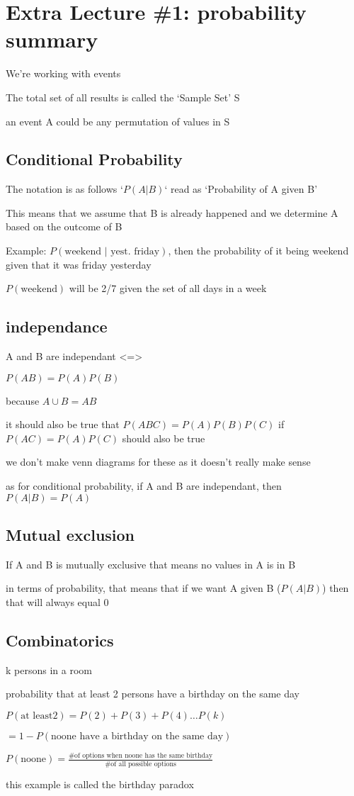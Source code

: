 \section*{Extra Lecture \#1: probability summary}
We're working with events

The total set of all results is called the `Sample Set' S

an event A could be any permutation of values in S

\subsection*{Conditional Probability}
The notation is as follows `$P(A|B)$` read as `Probability of A given B'

This means that we assume that B is already happened and we determine A based on the outcome of B

Example: $P(\text{weekend | yest.\ friday})$, then the probability of it being weekend given that it was friday yesterday

$P(\text{weekend})$ will be 2/7 given the set of all days in a week

\subsection*{independance}
A and B are independant <=>

$P(AB) = P(A)P(B)$

because $A \cup B = AB$

it should also be true that $P(ABC) = P(A)P(B)P(C)$ if $P(AC) = P(A)P(C)$ should also be true

we don't make venn diagrams for these as it doesn't really make sense

as for conditional probability, if A and B are independant, then $P(A|B) = P(A)$

\subsection*{Mutual exclusion}
If A and B is mutually exclusive that means no values in A is in B

in terms of probability, that means that if we want A given B ($P(A|B)$) then that will always equal 0

\subsection*{Combinatorics}
k persons in a room

probability that at least 2 persons have a birthday on the same day

$P(\text{at least}2) = P(2)+P(3)+P(4) \dots P(k)$

$= 1 - P(\text{noone have a birthday on the same day})$

$P(\text{noone}) = \frac{\text{\# of options when noone has the same birthday}}{\text{\# of all possible options}}$

this example is called the birthday paradox


